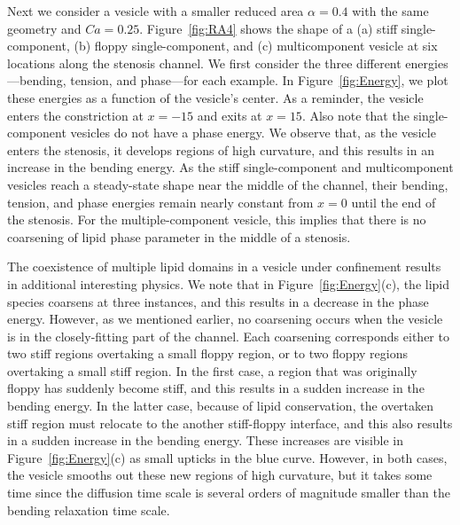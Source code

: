 \documentclass[twoside,twocolumn,9pt]{article}
\begin{document}
Next we consider a vesicle with a smaller reduced area $\alpha=0.4$ with
the same geometry and $Ca=0.25$. Figure~\ref{fig:RA4} shows the shape of
a (a) stiff single-component, (b) floppy single-component, and (c)
multicomponent vesicle at six locations along the stenosis channel. We
first consider the three different energies---bending, tension, and
phase---for each example. In Figure~\ref{fig:Energy}, we plot these
energies as a function of the vesicle's center. As a reminder, the
vesicle enters the constriction at $x=-15$ and exits at $x=15$. Also
note that the single-component vesicles do not have a phase energy.  We
observe that, as the vesicle enters the stenosis, it develops regions of
high curvature, and this results in an increase in the bending energy.
As the stiff single-component and multicomponent vesicles reach a
steady-state shape near the middle of the channel, their bending,
tension, and phase energies remain nearly constant from $x=0$ until the
end of the stenosis. For the multiple-component vesicle, this implies
that there is no coarsening of lipid phase parameter in the middle of a
stenosis.

The coexistence of multiple lipid domains in a vesicle under confinement
results in additional interesting physics. We note that in
Figure~\ref{fig:Energy}(c), the lipid species coarsens at three
instances, and this results in a decrease in the phase energy. However,
as we mentioned earlier, no coarsening occurs when the vesicle is in the
closely-fitting part of the channel. Each coarsening corresponds either
to two stiff regions overtaking a small floppy region, or to two floppy
regions overtaking a small stiff region. In the first case, a region
that was originally floppy has suddenly become stiff, and this results
in a sudden increase in the bending energy. In the latter case, because
of lipid conservation, the overtaken stiff region must relocate to the
another stiff-floppy interface, and this also results in a sudden
increase in the bending energy. These increases are visible in
Figure~\ref{fig:Energy}(c) as small upticks in the blue curve. However,
in both cases, the vesicle smooths out these new regions of high
curvature, but it takes some time since the diffusion time scale is
several orders of magnitude smaller than the bending relaxation time
scale.
\end{document}
